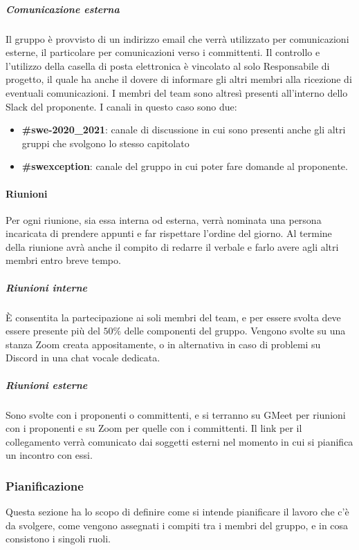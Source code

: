 \subparagraph{Comunicazione esterna}
Il gruppo è provvisto di un indirizzo email che verrà utilizzato per comunicazioni esterne, il particolare per comunicazioni verso i committenti. Il controllo e l'utilizzo della casella di posta elettronica è vincolato al solo Responsabile di progetto, il quale ha anche il dovere di informare gli altri membri alla ricezione di eventuali comunicazioni.
I membri del team sono altresì presenti all'interno dello Slack del proponente. I canali in questo caso sono due:
\begin{itemize}
    \item \textbf{\#swe-2020\_2021}: canale di discussione in cui sono presenti anche gli altri gruppi che svolgono lo stesso capitolato
    \item \textbf{\#swexception}: canale del gruppo in cui poter fare domande al proponente.
\end{itemize}

\paragraph{Riunioni}
Per ogni riunione, sia essa interna od esterna, verrà nominata una persona incaricata di prendere appunti e far rispettare l'ordine del giorno. Al termine della riunione avrà anche il compito di redarre il verbale e farlo avere agli altri membri entro breve tempo.

\subparagraph{Riunioni interne}
È consentita la partecipazione ai soli membri del team, e per essere svolta deve essere presente più del $50\%$ delle componenti del gruppo. Vengono svolte su una stanza Zoom creata appositamente, o in alternativa in caso di problemi su Discord in una chat vocale dedicata.

\subparagraph{Riunioni esterne}
Sono svolte con i proponenti o committenti, e si terranno su GMeet per riunioni con i proponenti e su Zoom per quelle con i committenti. Il link per il collegamento verrà comunicato dai soggetti esterni nel momento in cui si pianifica un incontro con essi.

\subsubsection{Pianificazione}
Questa sezione ha lo scopo di definire come si intende pianificare il lavoro che c'è da svolgere, come vengono assegnati i compiti tra i membri del gruppo, e in cosa consistono i singoli ruoli.


